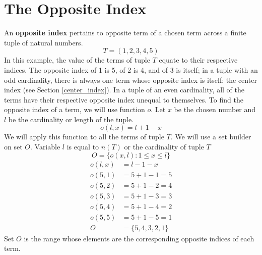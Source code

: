 \documentclass[letterpaper, twoside,12pt]{book}
\begin{document}
    \section{The Opposite Index}
    An \textbf{opposite index} pertains to opposite term of a chosen term across a finite tuple of natural numbers.
    \begin{equation*}
        T = (1,2,3,4,5)
    \end{equation*}
    In this example, the value of the terms of tuple $T$ equate to their respective indices. The opposite index of 1 is 5, of 2 is 4, and of 3 is itself; in a tuple with an odd cardinality, there is always one term whose opposite index is itself: the center index (see Section \ref{center_index}). In a tuple of an even cardinality, all of the terms have their respective opposite index unequal to themselves. To find the opposite index of a term, we will use function $o$. Let $x$ be the chosen number and $l$ be the cardinality or length of the tuple.
    \begin{equation}
        o(l,x) = l + 1 - x
    \end{equation}
    We will apply this function to all the terms of tuple $T$. We will use a set builder on set $O$. Variable $l$ is equal to $n(T)$ or the cardinality of tuple $T$
    \begin{equation*}
        O = \{ o(x,l) : 1 \leq x \leq l\}
    \end{equation*}
    \begin{equation*}
        \begin{split}
            o(l,x) &= l - 1 - x \\
            o(5,1) &= 5 + 1 - 1 = 5 \\
            o(5,2) &= 5 + 1 - 2 = 4 \\
            o(5,3) &= 5 + 1 - 3 = 3 \\
            o(5,4) &= 5 + 1 - 4 = 2 \\
            o(5,5) &= 5 + 1 - 5 = 1 \\
            O &= \{5,4,3,2,1\}
        \end{split}
    \end{equation*}
    Set $O$ is the range whose elements are the corresponding opposite indices of each term.
\end{document}
